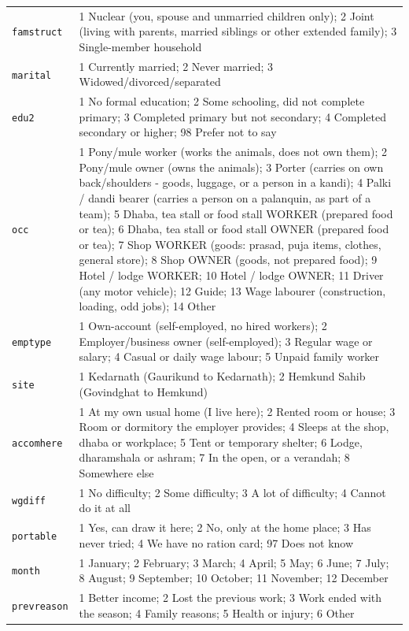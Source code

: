 \documentclass[10pt]{article}
\begin{document}
{\begin{longtable}{p{2cm}p{14cm}}
\texttt{famstruct} & 1 Nuclear (you, spouse and unmarried children only); 2 Joint (living with parents, married siblings or other extended family); 3 Single-member household \\
\texttt{marital} & 1 Currently married; 2 Never married; 3 Widowed/divorced/separated \\
\texttt{edu2} & 1 No formal education; 2 Some schooling, did not complete primary; 3 Completed primary but not secondary; 4 Completed secondary or higher; 98 Prefer not to say \\
\texttt{occ} & 1 Pony/mule worker (works the animals, does not own them); 2 Pony/mule owner (owns the animals); 3 Porter (carries on own back/shoulders - goods, luggage, or a person in a kandi); 4 Palki / dandi bearer (carries a person on a palanquin, as part of a team); 5 Dhaba, tea stall or food stall WORKER (prepared food or tea); 6 Dhaba, tea stall or food stall OWNER (prepared food or tea); 7 Shop WORKER (goods: prasad, puja items, clothes, general store); 8 Shop OWNER (goods, not prepared food); 9 Hotel / lodge WORKER; 10 Hotel / lodge OWNER; 11 Driver (any motor vehicle); 12 Guide; 13 Wage labourer (construction, loading, odd jobs); 14 Other \\
\texttt{emptype} & 1 Own-account (self-employed, no hired workers); 2 Employer/business owner (self-employed); 3 Regular wage or salary; 4 Casual or daily wage labour; 5 Unpaid family worker \\
\texttt{site} & 1 Kedarnath (Gaurikund to Kedarnath); 2 Hemkund Sahib (Govindghat to Hemkund) \\
\texttt{accomhere} & 1 At my own usual home (I live here); 2 Rented room or house; 3 Room or dormitory the employer provides; 4 Sleeps at the shop, dhaba or workplace; 5 Tent or temporary shelter; 6 Lodge, dharamshala or ashram; 7 In the open, or a verandah; 8 Somewhere else \\
\texttt{wgdiff} & 1 No difficulty; 2 Some difficulty; 3 A lot of difficulty; 4 Cannot do it at all \\
\texttt{portable} & 1 Yes, can draw it here; 2 No, only at the home place; 3 Has never tried; 4 We have no ration card; 97 Does not know \\
\texttt{month} & 1 January; 2 February; 3 March; 4 April; 5 May; 6 June; 7 July; 8 August; 9 September; 10 October; 11 November; 12 December \\
\texttt{prevreason} & 1 Better income; 2 Lost the previous work; 3 Work ended with the season; 4 Family reasons; 5 Health or injury; 6 Other \\

\end{longtable}}
\end{document}
